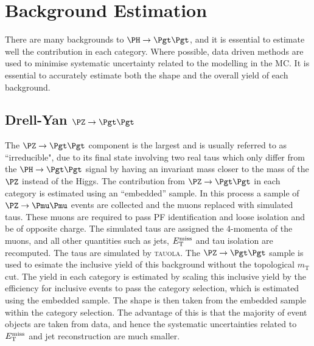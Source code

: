 \section{Background Estimation}
\label{sec:backgrounds}

There are many backgrounds to $\HToTauTau$, and it is essential to estimate well
the contribution in each category. Where possible, data driven methods
are used to minimise systematic uncertainty related to the modelling in the
\ac{MC}. It is essential to accurately estimate both the shape and the overall
yield of each background.

\subsection{Drell-Yan $\PZ \to\Pgt\Pgt$}
\label{sec:backgroundEstimation_Ztautau}

The $\PZ \to \Pgt\Pgt$ component is the largest and is usually referred to as ``irreducible", due to its final
state involving two real taus which only differ from the $\PH \to \Pgt\Pgt$ signal by
having an invariant mass closer to the mass of the $\PZ$ instead of the Higgs.
The contribution from $\ZToTauTau$ in each category is estimated using an
``embedded'' sample. In this process a sample of $\PZ\to\Pmu\Pmu$ events are
collected and the muons replaced with simulated taus. These muons are required
to pass \ac{PF} identification and loose isolation and be of opposite charge.
The simulated taus are assigned the 4-momenta of the muons, and all other
quantities such as jets, $E_{\mathrm{T}}^{\text{miss}}$ and tau isolation are recomputed. The taus
are simulated by \textsc{tauola}. The $\ZToTauTau$ sample is used to esimate 
the inclusive yield of this background without the topological $m_{\text{T}}$
cut. 
The yield in each category is estimated by scaling this inclusive yield by the efficiency for 
inclusive events to pass the category selection, which is estimated using the
embedded sample. The shape is then taken from the embedded sample within the
category selection. The advantage of this is that the majority of event objects
are taken from data, and hence the systematic uncertainties related to $E_{\mathrm{T}}^{\text{miss}}$
and jet reconstruction are much smaller. 


